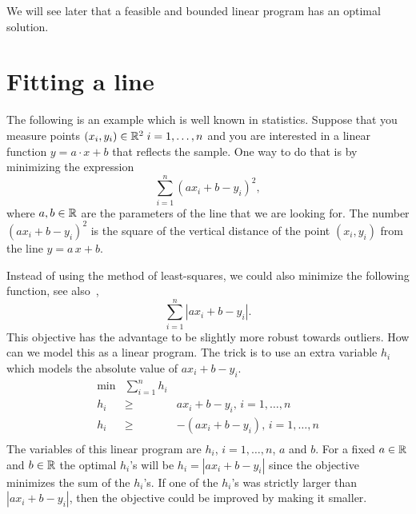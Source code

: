 We will see later that a feasible and bounded linear program has an
optimal solution.



\section{Fitting a line} 
\label{sec:fitting-line}

The following is an example which is well known in statistics. Suppose
that you  measure points $(x_i,y_i)\in \mathbb{R}^2 \; i=1,\ldots,n$ and you are interested in a
linear function $y = a\cdot x +b$ that reflects the sample. One way to do
that is by minimizing the expression
\begin{equation}
  \label{eq:56}
  \sum_{i=1}^n (ax_i + b-y_i)^2 , 
\end{equation}
where $a,b\in \mathbb{R}$ are the parameters of the line that we are looking
for. The number $(ax_i + b-y_i)^2$ is the square of the vertical
distance of the point $(x_i,y_i)$ from the line $ y = a\,x +b$. 

Instead of using the method of least-squares, we could also minimize
the following function, see also~\cite[Chapter 2.4]{1214763},
\begin{equation}
  \label{eq:57}
  \sum_{i=1}^n |ax_i + b-y_i|.
\end{equation}
This objective has the advantage to be slightly more robust towards
outliers. How can we model this as a linear program. The
trick is to use an extra variable $h_i$ which models the absolute
value of $ax_i+b - y_i$. 
\begin{equation}
  \label{eq:58}
  \begin{array}{lcr}
    \min & \sum_{i=1}^n h_i \\
    h_i & \geq & a x_i + b-y_i,  \, i=1,\ldots,n \\
    h_i & \geq & -(a x_i + b-y_i ),  \, i=1,\ldots,n \\    
  \end{array}
\end{equation}
The variables of this linear program are  $h_i$, $i=1,\ldots,n$, $a$ and
$b$. For a fixed $a\in \mathbb{R}$ and $b \in \mathbb{R}$ the optimal $h_i$'s will be
$h_i  = |ax_i + b-y_i|$ since the objective minimizes the sum of the
$h_i$'s. If one of the $h_i$'s was strictly larger than  $|ax_i + b-y_i|$,
then the objective could be improved by making it smaller. 

